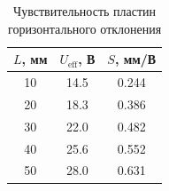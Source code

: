 \begin{table}[h]
\centering
\caption{Чувствительность пластин горизонтального отклонения}
\label{tab:pgo}
\begin{tabular}{|c|c|c|}
\hline
$L$, мм & $U_{\text{eff}}$, В & $S$, мм/В \\
\hline
10 & 14.5 & 0.244 \\
20 & 18.3 & 0.386 \\
30 & 22.0 & 0.482 \\
40 & 25.6 & 0.552 \\
50 & 28.0 & 0.631 \\
\hline
\end{tabular}
\end{table}
